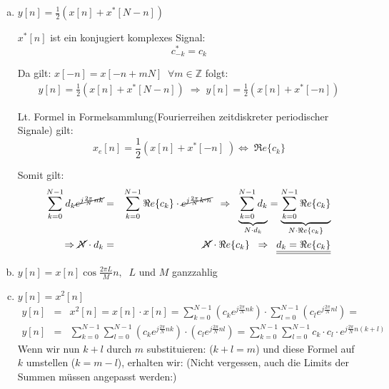 \begin{uebsp}
\begin{Answer}
\begin{enumerate}[a)]
        \item $y[n]=\frac{1}{2}\left(x[n]+x^*\left[N-n\right]\right)$
            \begin{uebsp_theory}
                $x^*[n]$ ist ein konjugiert komplexes Signal:
                \[c_{-k}^*=c_k\]
            \end{uebsp_theory}
            Da gilt: $x[-n]=x[-n+mN]\;\;\forall m\in\mathbb{Z}$ folgt:
            \begin{eqnarray*}
                y[n]=\frac{1}{2}(x[n]+x^*[N-n])\;\Rightarrow\;y[n]=\frac{1}{2}(x[n]+x^*[-n])
            \end{eqnarray*}
            \begin{uebsp_theory}
                Lt. Formel in Formelsammlung(Fourierreihen zeitdiskreter periodischer Signale) gilt:
                \[x_e[n]=\frac{1}{2}\left(x[n]+x^*[-n]\;\right)\Leftrightarrow\;\Re e\{c_k\}\]
            \end{uebsp_theory}
            Somit gilt:
            \begin{eqnarray*}
                \sum_{k=0}^{N-1}d_k\cancel{e^{j\frac{2\pi}{N}nk}}&=&\sum_{k=0}^{N-1}\Re e\{c_k\}\cdot \cancel{e^{j\frac{2\pi}{N}k\cdot n}}\;\;\Rightarrow\;\;
                \underbrace{\sum_{k=0}^{N-1}d_{k}}_{N\cdot d_{k}}=\underbrace{\sum_{k=0}^{N-1}\Re e\{c_k\}}_{N\cdot \Re e\{c_k\}}\\
                \Rightarrow\cancel N\cdot d_k&=&\cancel N\cdot \Re e\{c_k\}\;\;\Rightarrow\;\;
                \underline{\underline{d_k=\Re e\{c_{k}\}}}
            \end{eqnarray*}
        \item $y[n]=x[n]\cos\frac{2\pi L}{M}n,\;\;L$ und $M$ ganzzahlig
        \item $y[n]=x^2[n]$
            \begin{eqnarray*}
                y[n]&=&x^2[n]=x[n]\cdot x[n]= \sum_{k=0}^{N-1}\left(c_ke^{j\frac{2\pi}{N}nk}\right)\cdot \sum_{l=0}^{N-1}\left(c_le^{j\frac{2\pi}{N}nl}\right)=\\
                y[n]&=& \sum_{k=0}^{N-1}\sum_{l=0}^{N-1}\left(c_ke^{j\frac{2\pi}{N}nk}\right)\cdot \left(c_le^{j\frac{2\pi}{N}nl}\right)=\sum_{k=0}^{N-1}\sum_{l=0}^{N-1}c_k\cdot c_l\cdot e^{j\frac{2\pi}{N}n(k+l)}
            \end{eqnarray*}
            Wenn wir nun $k+l$ durch $m$ substituieren: ($k+l=m$) und diese Formel auf $k$ umstellen ($k=m-l$), erhalten wir: (Nicht vergessen, auch die Limits der Summen müssen angepasst werden:)

\end{enumerate}
\end{Answer}
\end{uebsp}
